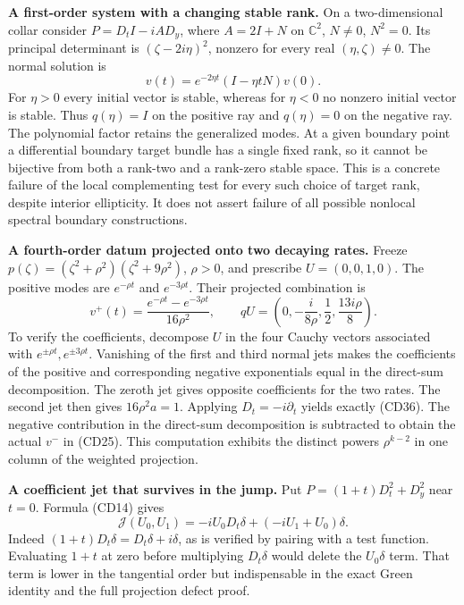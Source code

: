 \documentclass[
  11pt,
]{article}
\begin{document}
\textbf{A first-order system with a changing stable rank.} On a
two-dimensional collar consider \(P=D_tI-iAD_y\), where \(A=2I+N\) on
\(\mathbb C^2\), \(N\ne0\), \(N^2=0\). Its principal determinant is
\((\zeta-2i\eta)^2\), nonzero for every real \((\eta,\zeta)\ne0\). The
normal solution is \[
v(t)=e^{-2\eta t}(I-\eta tN)v(0).
\tag{CD35}
\] For \(\eta>0\) every initial vector is stable, whereas for \(\eta<0\)
no nonzero initial vector is stable. Thus \(q(\eta)=I\) on the positive
ray and \(q(\eta)=0\) on the negative ray. The polynomial factor retains
the generalized modes. At a given boundary point a differential boundary
target bundle has a single fixed rank, so it cannot be bijective from
both a rank-two and a rank-zero stable space. This is a concrete failure
of the local complementing test for every such choice of target rank,
despite interior ellipticity. It does not assert failure of all possible
nonlocal spectral boundary constructions.

\textbf{A fourth-order datum projected onto two decaying rates.} Freeze
\(p(\zeta)=(\zeta^2+\rho^2)(\zeta^2+9\rho^2)\), \(\rho>0\), and
prescribe \(U=(0,0,1,0)\). The positive modes are \(e^{-\rho t}\) and
\(e^{-3\rho t}\). Their projected combination is \[
v^+(t)=\frac{e^{-\rho t}-e^{-3\rho t}}{16\rho^2},\qquad
qU=\left(0,-\frac{i}{8\rho},\frac12,\frac{13i\rho}{8}\right).
\tag{CD36}
\] To verify the coefficients, decompose \(U\) in the four Cauchy
vectors associated with \(e^{\pm\rho t},e^{\pm3\rho t}\). Vanishing of
the first and third normal jets makes the coefficients of the positive
and corresponding negative exponentials equal in the direct-sum
decomposition. The zeroth jet gives opposite coefficients for the two
rates. The second jet then gives \(16\rho^2a=1\). Applying
\(D_t=-i\partial_t\) yields exactly (CD36). The negative contribution in
the direct-sum decomposition is subtracted to obtain the actual \(v^-\)
in (CD25). This computation exhibits the distinct powers \(\rho^{k-2}\)
in one column of the weighted projection.

\textbf{A coefficient jet that survives in the jump.} Put
\(P=(1+t)D_t^2+D_y^2\) near \(t=0\). Formula (CD14) gives \[
\mathcal J(U_0,U_1)=-iU_0D_t\delta+(-iU_1+U_0)\delta.
\tag{CD37}
\] Indeed \((1+t)D_t\delta=D_t\delta+i\delta\), as is verified by
pairing with a test function. Evaluating \(1+t\) at zero before
multiplying \(D_t\delta\) would delete the \(U_0\delta\) term. That term
is lower in the tangential order but indispensable in the exact Green
identity and the full projection defect proof.
\end{document}
